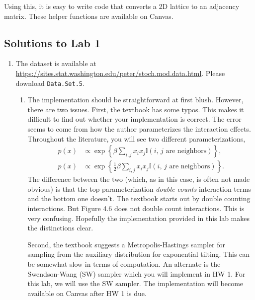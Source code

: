 \documentclass[11pt]{article}
\begin{document}
Using this, it is easy to write code that converts a 2D lattice to an adjacency matrix. These helper functions are available on Canvas.


\subsection*{Solutions to Lab 1}

\begin{enumerate}

\item The dataset is available at \url{https://sites.stat.washington.edu/peter/stoch.mod.data.html}. Please download \texttt{Data.Set.5}.

\begin{enumerate}
\item The implementation should be straightforward at first blush. However, there are two issues. First, the textbook has some typos. This makes it difficult to find out whether your implementation is correct. The error seems to come from how the author parameterizes the interaction effects. Throughout the literature, you will see two different parameterizations,
\begin{align*}
	p(x) &\propto \exp \left\{ \beta \sum_{i, j} x_i x_j \mathbb{I} (\text{$i$, $j$ are neighbors}) \right\}, \\
	p(x) &\propto \exp \left\{ \frac{1}{2} \beta \sum_{i, j} x_i x_j \mathbb{I} (\text{$i$, $j$ are neighbors}) \right\}.
\end{align*}
The difference between the two (which, as in this case, is often not made obvious) is that the top parameterization \textit{double counts} interaction terms and the bottom one doesn't. The textbook starts out by double counting interactions. But Figure 4.6 does not double count interactions. This is very confusing. Hopefully the implementation provided in this lab makes the distinctions clear.

Second, the textbook suggests a Metropolis-Hastings sampler for sampling from the auxiliary distribution for exponential tilting. This can be somewhat slow in terms of computation. An alternate is the Swendson-Wang (SW) sampler which you will implement in HW 1. For this lab, we will use the SW sampler. The implementation will become available on Canvas after HW 1 is due.


\end{enumerate}
\end{enumerate}
\end{document}
